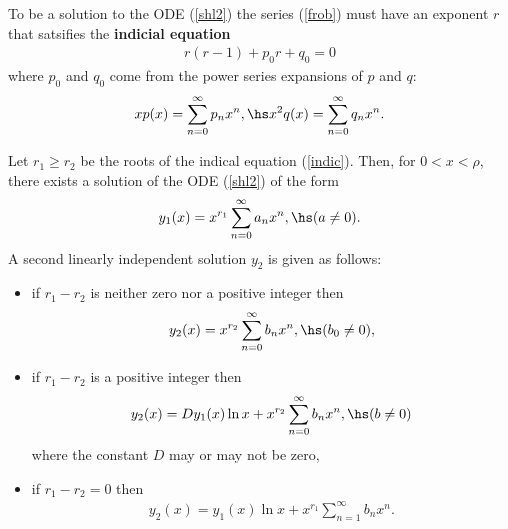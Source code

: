 \documentclass{article}
\begin{document}
\begin{theorem}
	To be a solution to the ODE (\ref{shl2}) the series (\ref{frob}) must
	have an exponent $r$ that satsifies the \textbf{indicial equation}
	\begin{align}
		\label{indic}
		r(r-1) + p_0r + q_0 = 0
	\end{align}
	where $p_0$ and $q_0$ come from the power series expansions of $p$
	and $q$:
	\begin{align*}
		xp(x) = \sum_{n=0}^\infty p_n x^n,\hs x^2q(x)=\sum_{n=0}^\infty q_nx^n.
	\end{align*}
\end{theorem}

\begin{theorem}
	Let $r_1\geq r_2$ be the roots of the indical equation (\ref{indic}).
	Then, for $0<x<\rho$, there exists a solution of the ODE (\ref{shl2}) of the
	form
	\begin{align*}
		y_1(x)=x^{r_1} \sum_{n=0}^\infty a_nx^n,\hs(a\not=0).
	\end{align*}
	A second linearly independent solution $y_2$ is given as follows:
	\begin{itemize}
		\item if $r_1-r_2$ is neither zero nor a positive integer then \begin{align*}
			      y_2(x) = x^{r_2}\sum_{n=0}^\infty b_nx^n,\hs(b_0\not=0),
		      \end{align*}
		\item if $r_1-r_2$ is a positive integer then \begin{align*}
			      y_2(x) = Dy_1(x)\ln x + x^{r_2}\sum_{n=0}^\infty b_nx^n,\hs(b\not=0)
		      \end{align*}
		      where the constant $D$ may or may not be zero,
		\item if $r_1-r_2=0$ then \begin{align*}
			      y_2(x) = y_1(x)\ln x + x^{r_1}\sum_{n=1}^\infty b_nx^n.
		      \end{align*}
	\end{itemize}
\end{theorem}
\end{document}
